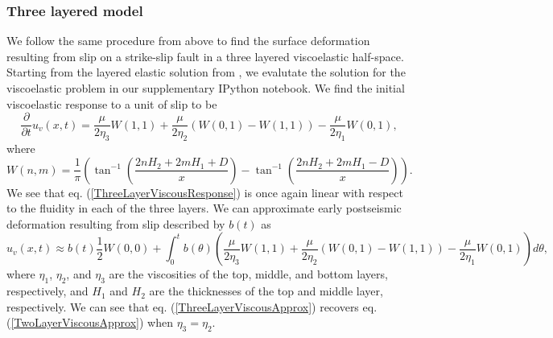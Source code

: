 \documentclass[extra,mreferee]{gji}
\begin{document}
\subsubsection{Three layered model}
We follow the same procedure from above to find the surface
deformation resulting from slip on a strike-slip fault in a three
layered viscoelastic half-space.  Starting from the layered elastic
solution from \citet{CJ1972}, we evalutate the solution for the
viscoelastic problem in our supplementary IPython notebook.  We find
the initial viscoelastic response to a unit of slip to be
\begin{equation}\label{ThreeLayerViscousResponse}
\frac{\partial}{\partial t}u_v(x,t) = \frac{\mu}{2\eta_3}W(1,1)
                                      +\frac{\mu}{2\eta_2}(W(0,1) - W(1,1))
                                      -\frac{\mu}{2\eta_1}W(0,1),
\end{equation}
where
\begin{equation}
  W(n,m) = \frac{1}{\pi}\left(\tan^{-1}\left(\frac{2nH_2 + 2mH_1 + D}{x}\right) - 
                              \tan^{-1}\left(\frac{2nH_2 + 2mH_1 - D}{x}\right)\right).
\end{equation}
We see that eq. (\ref{ThreeLayerViscousResponse}) is once again linear
with respect to the fluidity in each of the three layers.  We can
approximate early postseismic deformation resulting from slip
described by $b(t)$ as
\begin{equation}\label{ThreeLayerViscousApprox}
u_v(x,t) \approx b(t)\frac{1}{2} W(0,0) + 
         \int_0^tb(\theta)\left(\frac{\mu}{2\eta_3}W(1,1)
                               +\frac{\mu}{2\eta_2}(W(0,1) - W(1,1))
                               -\frac{\mu}{2\eta_1}W(0,1)\right)d\theta,
\end{equation}
where $\eta_1$, $\eta_2$, and $\eta_3$ are the viscosities of the top,
middle, and bottom layers, respectively, and $H_1$ and $H_2$ are the
thicknesses of the top and middle layer, respectively.  We can see
that eq. (\ref{ThreeLayerViscousApprox}) recovers eq.
(\ref{TwoLayerViscousApprox}) when $\eta_3 = \eta_2$.

\end{document}
